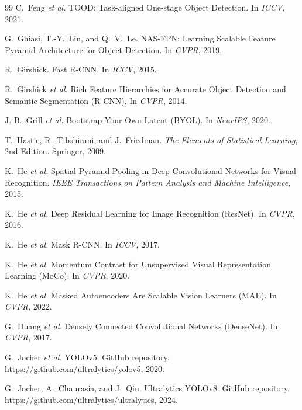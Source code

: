 \begin{thebibliography}{99}
C.~Feng \textit{et al.}
\newblock TOOD: Task-aligned One-stage Object Detection.
\newblock In \textit{ICCV}, 2021.

G.~Ghiasi, T.-Y.~Lin, and Q.~V.~Le.
\newblock NAS-FPN: Learning Scalable Feature Pyramid Architecture for Object Detection.
\newblock In \textit{CVPR}, 2019.

R.~Girshick.
\newblock Fast R-CNN.
\newblock In \textit{ICCV}, 2015.

R.~Girshick \textit{et al.}
\newblock Rich Feature Hierarchies for Accurate Object Detection and Semantic Segmentation (R-CNN).
\newblock In \textit{CVPR}, 2014.

J.-B.~Grill \textit{et al.}
\newblock Bootstrap Your Own Latent (BYOL).
\newblock In \textit{NeurIPS}, 2020.

T.~Hastie, R.~Tibshirani, and J.~Friedman.
\newblock \textit{The Elements of Statistical Learning}, 2nd Edition.
\newblock Springer, 2009.

K.~He \textit{et al.}
\newblock Spatial Pyramid Pooling in Deep Convolutional Networks for Visual Recognition.
\newblock \textit{IEEE Transactions on Pattern Analysis and Machine Intelligence}, 2015.

K.~He \textit{et al.}
\newblock Deep Residual Learning for Image Recognition (ResNet).
\newblock In \textit{CVPR}, 2016.

K.~He \textit{et al.}
\newblock Mask R-CNN.
\newblock In \textit{ICCV}, 2017.

K.~He \textit{et al.}
\newblock Momentum Contrast for Unsupervised Visual Representation Learning (MoCo).
\newblock In \textit{CVPR}, 2020.

K.~He \textit{et al.}
\newblock Masked Autoencoders Are Scalable Vision Learners (MAE).
\newblock In \textit{CVPR}, 2022.

G.~Huang \textit{et al.}
\newblock Densely Connected Convolutional Networks (DenseNet).
\newblock In \textit{CVPR}, 2017.

G.~Jocher \textit{et al.}
\newblock YOLOv5.
\newblock GitHub repository. \url{https://github.com/ultralytics/yolov5}, 2020.

G.~Jocher, A.~Chaurasia, and J.~Qiu.
\newblock Ultralytics YOLOv8.
\newblock GitHub repository. \url{https://github.com/ultralytics/ultralytics}, 2024.


\end{thebibliography}
